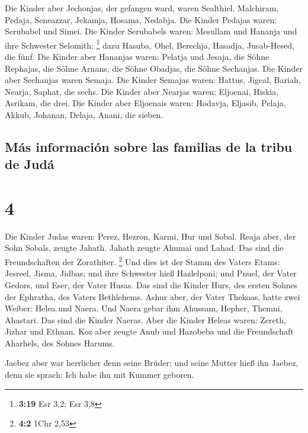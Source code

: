  Die Kinder aber Jechonjas, der gefangen ward, waren
Sealthiel,  Malchiram, Pedaja, Seneazzar, Jekamja,
Hosama, Nedabja.  Die Kinder Pedajas waren: Serubabel und
Simei. Die Kinder Serubabels waren: Mesullam und Hananja und ihre
Schwester Selomith; \footnote{\textbf{3:19} Esr 3,2; Esr 3,8}
 dazu Hasuba, Ohel, Berechja, Hasadja, Jusab-Hesed, die
fünf.  Die Kinder aber Hananjas waren: Pelatja und
Jesaja, die Söhne Rephajas, die Söhne Arnans, die Söhne Obadjas, die
Söhne Sechanjas.  Die Kinder aber Sechanjas waren Semaja.
Die Kinder Semajas waren: Hattus, Jigeal, Bariah, Nearja, Saphat, die
sechs.  Die Kinder aber Nearjas waren: Eljoenai, Hiskia,
Asrikam, die drei.  Die Kinder aber Eljoenais waren:
Hodavja, Eljasib, Pelaja, Akkub, Johanan, Delaja, Anani, die sieben.

\hypertarget{muxe1s-informaciuxf3n-sobre-las-familias-de-la-tribu-de-juduxe1}{%
\subsection{Más información sobre las familias de la tribu de
Judá}\label{muxe1s-informaciuxf3n-sobre-las-familias-de-la-tribu-de-juduxe1}}

\hypertarget{section-3}{%
\section{4}\label{section-3}}

 Die Kinder Judas waren: Perez, Hezron, Karmi, Hur und
Sobal.  Reaja aber, der Sohn Sobals, zeugte Jahath. Jahath
zeugte Ahumai und Lahad. Das sind die Freundschaften der Zorathiter.
\footnote{\textbf{4:2} 1Chr 2,53}  Und dies ist der Stamm
des Vaters Etams: Jesreel, Jisma, Jidbas; und ihre Schwester hieß
Hazlelponi;  und Pnuel, der Vater Gedors, und Eser, der
Vater Husas. Das sind die Kinder Hurs, des ersten Sohnes der Ephratha,
des Vaters Bethlehems.  Ashur aber, der Vater Thekoas,
hatte zwei Weiber: Helea und Naera.  Und Naera gebar ihm
Ahussam, Hepher, Themni, Ahastari. Das sind die Kinder Naeras.
 Aber die Kinder Heleas waren: Zereth, Jizhar und Ethnan.
 Koz aber zeugte Anub und Hazobeba und die Freundschaft
Aharhels, des Sohnes Harums.

 Jaebez aber war herrlicher denn seine Brüder; und seine
Mutter hieß ihn Jaebez, denn sie sprach: Ich habe ihn mit Kummer
geboren.

